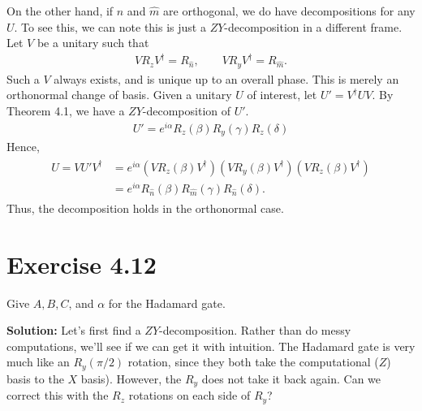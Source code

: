 \documentclass{book}
\begin{document}
    On the other hand, if $\hat{n}$ and $\hat{m}$ are orthogonal, we do have decompositions for any $U$. To see this, we can note this is just a $ZY$-decomposition in a different frame. Let $V$ be a unitary such that 
    \begin{align}
        V R_z V^\dagger = R_{\hat{n}}, \qquad V R_y V^\dagger = R_{\hat{m}}.
    \end{align}
    Such a $V$ always exists, and is unique up to an overall phase. This is merely an orthonormal change of basis. Given a unitary $U$ of interest, let $U' = V^\dagger U V$. By Theorem 4.1, we have a $ZY$-decomposition of $U'$.
    \begin{align}
        U' = e^{i\alpha} R_z(\beta) R_y(\gamma) R_z(\delta)
    \end{align}
    Hence,
    \begin{align}
    \begin{aligned}
        U = V U' V^\dagger &= e^{i\alpha} \left(V R_{z}(\beta)V^\dagger\right) \left(V R_y(\beta)V^\dagger\right) \left(V R_{z}(\beta)V^\dagger\right) \\
        &= e^{i\alpha} R_{\hat{n}}(\beta) R_{\hat{m}}(\gamma) R_{\hat{n}}(\delta).
    \end{aligned}
    \end{align}
    Thus, the decomposition holds in the orthonormal case.

\section*{Exercise 4.12}
    Give $A, B, C$, and $\alpha$ for the Hadamard gate.

    \textbf{Solution:} Let's first find a $ZY$-decomposition. Rather than do messy computations, we'll see if we can get it with intuition. The Hadamard gate is very much like an $R_y(\pi/2)$ rotation, since they both take the computational ($Z$) basis to the $X$ basis). However, the $R_y$ does not take it back again. Can we correct this with the $R_z$ rotations on each side of $R_y$?
\end{document}

